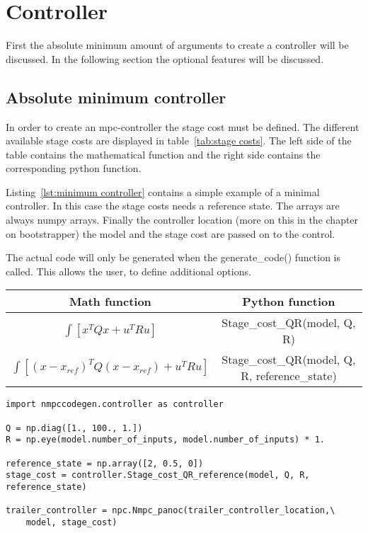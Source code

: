 \section{Controller}
First the absolute minimum amount of arguments to create a controller will be discussed. In the following section the optional features will be discussed.
\subsection{Absolute minimum controller}
In order to create an mpc-controller the stage cost must be defined. The different available stage costs are displayed in table~\ref{tab:stage costs}. The left side of the table contains the mathematical function and the right side contains the corresponding python function. 

Listing~\ref{lst:minimum controller} contains a simple example of a minimal controller. In this case the stage costs needs a reference state. The arrays are always numpy arrays. Finally the controller location (more on this in the chapter on bootstrapper) the model and the stage cost are passed on to the control.

The actual code will only be generated when the generate\_code() function is called. This allows the user, to define additional options.

\begin{center}
	\begin{tabular}{ |c|c| } 
		\hline
		Math function & Python function \\ 
		\hline
		$\int[x^TQx+u^TRu]$ & Stage\_cost\_QR(model, Q, R) \\ 
		\hline
		$\int[(x-x_{ref})^TQ(x-x_{ref})+u^TRu]$ & Stage\_cost\_QR(model, Q, R, reference\_state) \\ 
		\hline
	\end{tabular}
	\label{tab:stage costs}
\end{center}

\begin{lstlisting}[caption={simple controller},captionpos=b,label={lst:minimum controller}]
import nmpccodegen.controller as controller

Q = np.diag([1., 100., 1.])
R = np.eye(model.number_of_inputs, model.number_of_inputs) * 1.

reference_state = np.array([2, 0.5, 0])
stage_cost = controller.Stage_cost_QR_reference(model, Q, R, reference_state)

trailer_controller = npc.Nmpc_panoc(trailer_controller_location,\
	model, stage_cost)
\end{lstlisting}

